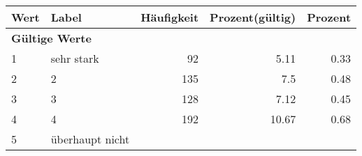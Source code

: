      \begin{longtable}{lXrrr}
     \toprule
     \textbf{Wert} & \textbf{Label} & \textbf{Häufigkeit} & \textbf{Prozent(gültig)} & \textbf{Prozent} \\
     \endhead
     \midrule
     \multicolumn{5}{l}{\textbf{Gültige Werte}}\\

     1 &
     \multicolumn{1}{X}{ sehr stark   } &


       \num{92} &
       \num[round-mode=places,round-precision=2]{5,11} &
         \num[round-mode=places,round-precision=2]{0,33} \\

     2 &
     \multicolumn{1}{X}{ 2   } &


       \num{135} &
       \num[round-mode=places,round-precision=2]{7,5} &
         \num[round-mode=places,round-precision=2]{0,48} \\

     3 &
     \multicolumn{1}{X}{ 3   } &


       \num{128} &
       \num[round-mode=places,round-precision=2]{7,12} &
         \num[round-mode=places,round-precision=2]{0,45} \\

     4 &
     \multicolumn{1}{X}{ 4   } &


       \num{192} &
       \num[round-mode=places,round-precision=2]{10,67} &
         \num[round-mode=places,round-precision=2]{0,68} \\

     5 &
     \multicolumn{1}{X}{ überhaupt nicht   } &



\end{longtable}
